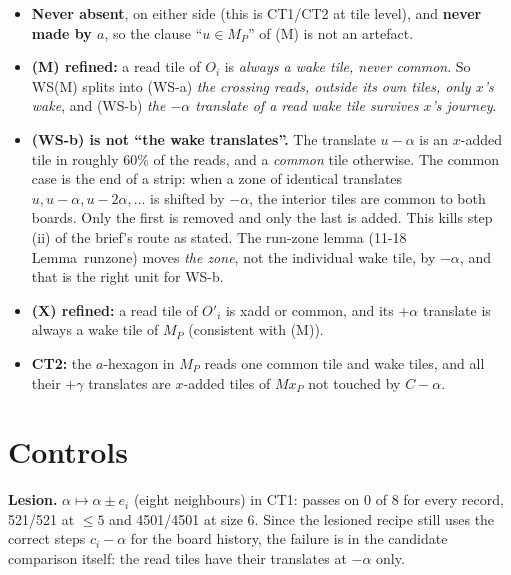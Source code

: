 \begin{itemize}
\item \textbf{Never absent}, on either side (this is CT1/CT2 at tile level), and \textbf{never made by $a$}, so the clause ``$u\in M_P$'' of (M) is not an artefact.
\item \textbf{(M) refined:} a read tile of $O_i$ is \emph{always a wake tile, never common}. So WS(M) splits into (WS-a) \emph{the crossing reads, outside its own tiles, only $x$'s wake}, and (WS-b) \emph{the $-\alpha$ translate of a read wake tile survives $x$'s journey}.
\item \textbf{(WS-b) is not ``the wake translates''.} The translate $u-\alpha$ is an $x$-added tile in roughly 60\% of the reads, and a \emph{common} tile otherwise. The common case is the end of a strip: when a zone of identical translates $u,u-\alpha,u-2\alpha,\dots$ is shifted by $-\alpha$, the interior tiles are common to both boards. Only the first is removed and only the last is added.
This kills step (ii) of the brief's route as stated. The run-zone lemma (11-18 Lemma~runzone) moves \emph{the zone}, not the individual wake tile, by $-\alpha$, and that is the right unit for WS-b.
\item \textbf{(X) refined:} a read tile of $O'_i$ is xadd or common, and its $+\alpha$ translate is always a wake tile of $M_P$ (consistent with (M)).
\item \textbf{CT2:} the $a$-hexagon in $M_P$ reads one common tile and wake tiles, and all their $+\gamma$ translates are $x$-added tiles of $Mx_P$ not touched by $C-\alpha$.
\end{itemize}

\section{Controls}\label{sec:ctrl}
\textbf{Lesion.} $\alpha\mapsto\alpha\pm e_i$ (eight neighbours) in CT1: passes on 0 of 8 for every record, 521/521 at $\le5$ and 4501/4501 at size 6. Since the lesioned recipe still uses the correct steps $c_i-\alpha$ for the board history, the failure is in the candidate comparison itself: the read tiles have their translates at $-\alpha$ only.

